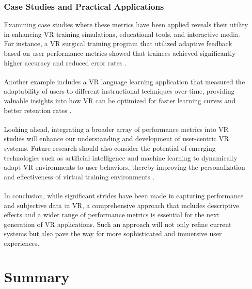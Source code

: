 \subsubsection{Case Studies and Practical Applications}
Examining case studies where these metrics have been applied reveals their utility in enhancing \ac{VR} training simulations, educational tools, and interactive media. For instance, a \ac{VR} surgical training program that utilized adaptive feedback based on user performance metrics showed that trainees achieved significantly higher accuracy and reduced error rates \cite{vrSurgicalTraining2023}.\\ \\
Another example includes a \ac{VR} language learning application that measured the adaptability of users to different instructional techniques over time, providing valuable insights into how \ac{VR} can be optimized for faster learning curves and better retention rates \cite{vrLanguageLearning2021}.\\ \\
Looking ahead, integrating a broader array of performance metrics into \ac{VR} studies will enhance our understanding and development of user-centric \ac{VR} systems. Future research should also consider the potential of emerging technologies such as artificial intelligence and machine learning to dynamically adapt VR environments to user behaviors, thereby improving the personalization and effectiveness of virtual training environments \cite{aiInVr2023}.\\ \\
In conclusion, while significant strides have been made in capturing performance and subjective data in \ac{VR}, a comprehensive approach that includes descriptive effects and a wider range of performance metrics is essential for the next generation of \ac{VR} applications. Such an approach will not only refine current systems but also pave the way for more sophisticated and immersive user experiences.

\section{Summary}
\label{sec:SummaryBackground}

